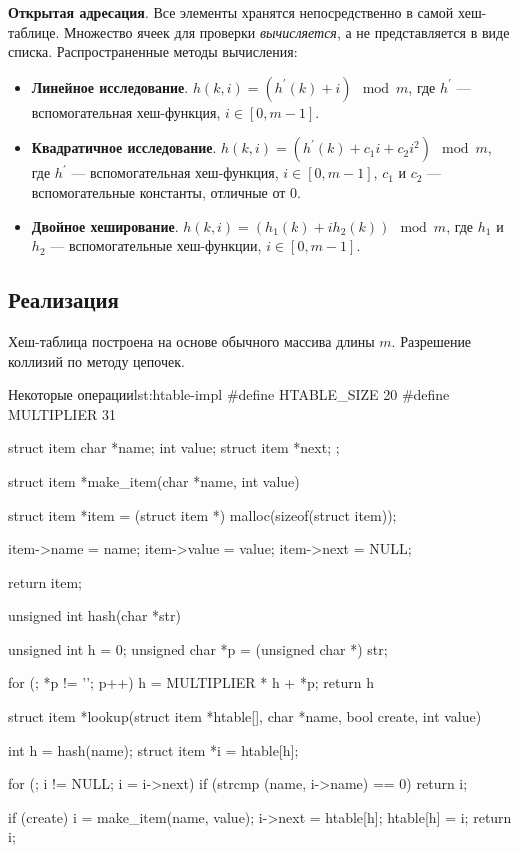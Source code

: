 \textbf{Открытая адресация}. Все элементы хранятся непосредственно в самой хеш-таблице. Множество ячеек для проверки \emph{вычисляется}, а не представляется в виде списка. Распространенные методы вычисления:
\begin{itemize}
  \item \textbf{Линейное исследование}. $h(k, i) = (h^{'}(k) + i) \mod m$, где $h^{'}$ --- вспомогательная хеш-функция, $i \in [0, m -1 ]$.
  \item \textbf{Квадратичное исследование}. $h(k, i) = (h^{'}(k) + c_1i + c_2i^2) \mod m$, где $h^{'}$ --- вспомогательная хеш-функция, $i \in [0, m -1 ]$, $c_1$ и $c_2$ --- вспомогательные константы, отличные от $0$.
  \item \textbf{Двойное хеширование}. $h(k, i) = (h_1(k) + ih_2(k)) \mod m$, где $h_1$ и $h_2$ --- вспомогательные хеш-функции, $i \in [0, m -1 ]$.
\end{itemize}

\subsection{Реализация}
Хеш-таблица построена на основе обычного массива длины $m$. Разрешение коллизий по методу цепочек.

\begin{clst}{Некоторые операции}{lst:htable-impl}
#define HTABLE_SIZE   20
#define MULTIPLIER    31

struct item {
    char *name;
    int value;
    struct item *next;
};

struct item *make_item(char *name, int value)
{
    struct item *item = (struct item *) malloc(sizeof(struct item));

    item->name = name;
    item->value = value;
    item->next = NULL;

    return item;
}

unsigned int hash(char *str)
{
    unsigned int h = 0;
    unsigned char *p = (unsigned char *) str;

    for (; *p != '\0'; p++)
        h = MULTIPLIER * h + *p;
    return h %
}

struct item *lookup(struct item *htable[], char *name, bool create, int value)
{
    int h = hash(name);
    struct item *i = htable[h];

    for (; i != NULL; i = i->next)
        if (strcmp (name, i->name) == 0)
            return i;

    if (create) {
        i = make_item(name, value);
        i->next = htable[h];
        htable[h] = i;
    }
    return i;
}
\end{clst}

